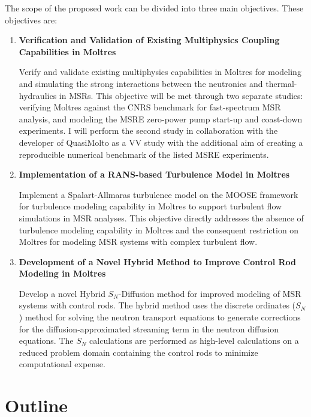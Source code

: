 The scope of the proposed work can be divided into three main objectives. These objectives are:
%
\begin{enumerate}[itemindent=20pt, listparindent=1.5em, label=\textbf{\arabic*}]
  \item \textbf{Verification and Validation of Existing Multiphysics Coupling Capabilities in
    Moltres}

    Verify and validate existing multiphysics capabilities in Moltres for modeling and simulating
    the strong interactions between the neutronics and thermal-hydraulics in \glspl{MSR}. This
    objective will be met through two separate studies: verifying Moltres against the CNRS
    benchmark \cite{tiberga_results_2020} for fast-spectrum \gls{MSR} analysis, and modeling the
    \gls{MSRE} zero-power pump start-up and coast-down experiments. I will perform the second study
    in collaboration with the developer of QuasiMolto \cite{reynolds_analysis_2023} as a \gls{VV}
    study with the additional aim of creating a reproducible numerical benchmark of the listed
    \gls{MSRE} experiments.

  \item \textbf{Implementation of a \gls{RANS}-based Turbulence Model in Moltres}

    Implement a Spalart-Allmaras turbulence model on the \gls{MOOSE} framework for
    turbulence modeling capability in Moltres to support turbulent flow simulations in \gls{MSR}
    analyses. This objective directly addresses the absence of turbulence modeling capability in
    Moltres and the consequent restriction on Moltres for modeling \gls{MSR} systems with complex
    turbulent flow.

  \item \textbf{Development of a Novel Hybrid Method to Improve Control Rod Modeling in Moltres}

    Develop a novel Hybrid $S_N$-Diffusion method for improved modeling of \gls{MSR} systems with
    control rods. The hybrid method uses the discrete ordinates ($S_N$) method for solving the
    neutron transport equations to generate corrections for the diffusion-approximated streaming
    term in the neutron diffusion equations. The $S_N$ calculations are performed as high-level
    calculations on a reduced problem domain containing the control rods to minimize computational
    expense.
\end{enumerate}

\section{Outline}

